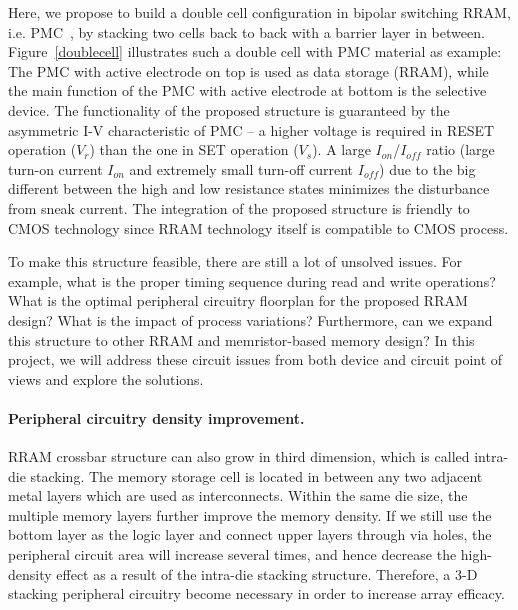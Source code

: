 Here, we propose to build a double cell configuration in bipolar switching RRAM, i.e. PMC~\cite{Kozicki05}, by stacking two cells back to back with a barrier layer in between. Figure~\ref{doublecell} illustrates such a double cell with PMC material as example: The PMC with active electrode on top is used as data storage (RRAM), while the main function of the PMC with active electrode at bottom is the selective device. The functionality of the proposed structure is guaranteed by the asymmetric I-V characteristic of PMC -- a higher voltage is required in RESET operation ($V_r$) than the one in SET operation ($V_s$). A large $I_{on}$/$I_{off}$ ratio (large turn-on current $I_{on}$ and extremely small turn-off current $I_{off}$) due to the big different between the high and low resistance states minimizes the disturbance from sneak current. The integration of the proposed structure is friendly to CMOS technology since RRAM technology itself is compatible to CMOS process.

To make this structure feasible, there are still a lot of unsolved issues. For example, what is the proper timing sequence during read and write operations? What is the optimal peripheral circuitry floorplan for the proposed RRAM design? What is the impact of process variations? Furthermore, can we expand this structure to other RRAM and memristor-based memory design? In this project, we will address these circuit issues from both device and circuit point of views and explore the solutions.

\paragraph{Peripheral circuitry density improvement.}
RRAM crossbar structure can also grow in third dimension, which is called intra-die stacking. The memory storage cell is located in between any two adjacent metal layers which are used as interconnects. Within the same die size, the multiple memory layers further improve the memory density. If we still use the bottom layer as the logic layer and connect upper layers through via holes, the peripheral circuit area will increase several times,  and hence decrease the high-density effect as a result of the intra-die stacking structure. Therefore, a 3-D stacking peripheral circuitry become necessary in order to increase array efficacy.

